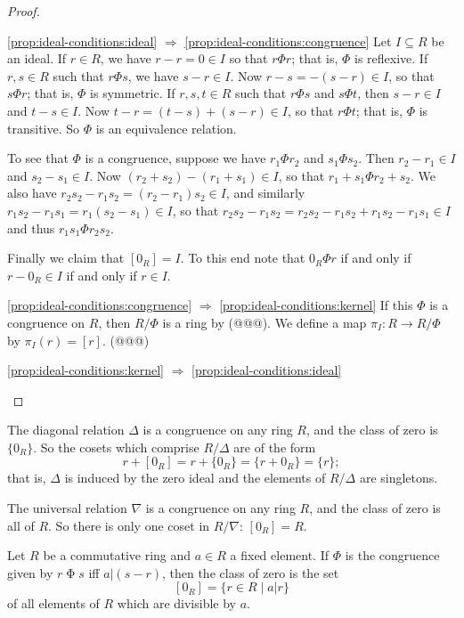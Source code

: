 \begin{proof}\mbox{}
\begin{proplist}
\item[\ref{prop:ideal-conditions:ideal} \(\Rightarrow\) \ref{prop:ideal-conditions:congruence}] Let \(I \subseteq R\) be an ideal.
If \(r \in R\), we have \(r - r = 0 \in I\) so that \(r \Phi r\); that is, \(\Phi\) is reflexive.
If \(r,s \in R\) such that \(r \Phi s\), we have \(s-r \in I\).
Now \(r-s = -(s-r) \in I\), so that \(s \Phi r\); that is, \(\Phi\) is symmetric.
If \(r,s,t \in R\) such that \(r \Phi s\) and \(s \Phi t\), then \(s-r \in I\) and \(t-s \in I\).
Now \(t-r = (t-s) + (s-r) \in I\), so that \(r \Phi t\); that is, \(\Phi\) is transitive.
So \(\Phi\) is an equivalence relation.

To see that \(\Phi\) is a congruence, suppose we have \(r_1 \Phi r_2\) and \(s_1 \Phi s_2\).
Then \(r_2 - r_1 \in I\) and \(s_2 - s_1 \in I\).
Now \((r_2+s_2) - (r_1+s_1) \in I\), so that \(r_1+s_1 \Phi r_2+s_2\).
We also have \(r_2s_2 - r_1s_2 = (r_2-r_1)s_2 \in I\), and similarly \(r_1s_2 - r_1s_1 = r_1(s_2 - s_1) \in I\), so that \(r_2s_2 - r_1s_2 = r_2s_2 - r_1s_2 + r_1s_2 - r_1s_1 \in I\) and thus \(r_1s_1 \Phi r_2s_2\).

Finally we claim that \([0_R] = I\).
To this end note that \(0_R \Phi r\) if and only if \(r - 0_R \in I\) if and only if \(r \in I\).

\item[\ref{prop:ideal-conditions:congruence} \(\Rightarrow\) \ref{prop:ideal-conditions:kernel}] If this \(\Phi\) is a congruence on \(R\), then \(R/\Phi\) is a ring by (@@@).
We define a map \(\pi_I : R \rightarrow R/\Phi\) by \(\pi_I(r) = [r]\). (@@@)

\item[\ref{prop:ideal-conditions:kernel} \(\Rightarrow\) \ref{prop:ideal-conditions:ideal}] 
\end{proplist}
\end{proof}

\begin{examples}
\item The diagonal relation \(\Delta\) is a congruence on any ring \(R\), and the class of zero is \(\{0_R\}\).
So the cosets which comprise \(R/\Delta\) are of the form \[ r+[0_R] = r+\{0_R\} = \{ r+0_R \} = \{r\}; \] that is, \(\Delta\) is induced by the zero ideal and the elements of \(R/\Delta\) are singletons.
\item The universal relation \(\nabla\) is a congruence on any ring \(R\), and the class of zero is all of \(R\).
So there is only one coset in \(R/\nabla\): \([0_R] = R\).
\item Let \(R\) be a commutative ring and \(a \in R\) a fixed element.
If \(\Phi\) is the congruence given by \(r \mathrel{\Phi} s\) iff \(a|(s-r)\), then the class of zero is the set \[ [0_R] = \{ r \in R \mid a|r \} \] of all elements of \(R\) which are divisible by \(a\).
\end{examples}

